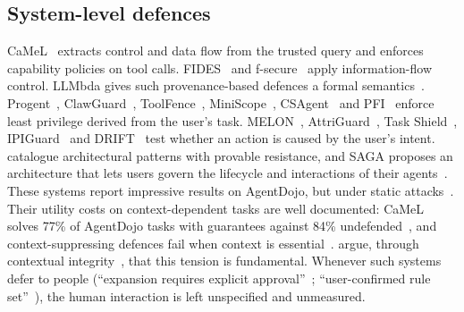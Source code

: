 \documentclass[preprint,12pt,nonatbib]{elsarticle}
\theoremstyle{remark}
\begin{document}
\subsection{System-level defences}
CaMeL~\citep{debenedetti2026camel} extracts control and data flow from the
trusted query and enforces capability policies on tool calls. FIDES~\citep{costa2025fides}
and f-secure~\citep{wu2024fsecure} apply information-flow control. LLMbda gives
such provenance-based defences a formal semantics~\citep{garby2026llmbda}.
Progent~\citep{shi2025progent}, ClawGuard~\citep{zhao2026clawguard},
ToolFence~\citep{li2026toolfence}, MiniScope~\citep{zhu2025miniscope}, CSAgent~\citep{gong2025csagent}
and PFI~\citep{kim2025pfi} enforce least privilege derived from the user's task.
MELON~\citep{zhu2025melon}, AttriGuard~\citep{he2026attriguard}, Task
Shield~\citep{jia2025taskshield}, IPIGuard~\citep{an2025ipiguard} and
DRIFT~\citep{li2025drift} test whether an action is caused by the user's intent.
\citet{beurerkellner2025patterns} catalogue architectural patterns with
provable resistance, and SAGA proposes an architecture that lets users govern
the lifecycle and interactions of their agents~\citep{syros2026saga}. These systems report impressive results on AgentDojo, but
under static attacks~\citep{narisetty2026adaptive}. Their utility costs on
context-dependent tasks are well documented: CaMeL solves 77\% of AgentDojo
tasks with guarantees against 84\% undefended~\citep{debenedetti2026camel}, and
context-suppressing defences fail when context is
essential~\citep{wang2026landscape}. \citet{abdelnabi2026always} argue, through
contextual integrity~\citep{nissenbaum2004privacy}, that this tension is
fundamental. Whenever such systems defer to people (``expansion requires
explicit approval''~\citep{shi2025progent}; ``user-confirmed rule
set''~\citep{zhao2026clawguard}), the human interaction is left unspecified and
unmeasured.
\end{document}
